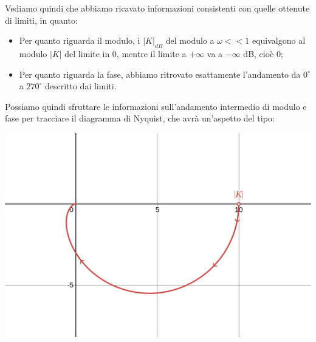 \documentclass[a4paper,11pt]{article}
\begin{document}
Vediamo quindi che abbiamo ricavato informazioni consistenti con quelle ottenute di limiti, in quanto:
\begin{itemize}
	\item Per quanto riguarda il modulo, i $|K|_{dB}$ del modulo a $\omega << 1$ equivalgono al modulo $|K|$ del limite in 0, mentre il limite a $+\infty$ va a $-\infty$ dB, cioè 0;
	\item Per quanto riguarda la fase, abbiamo ritrovato esattamente l'andamento da $0^\circ$ a $270^\circ$ descritto dai limiti.
\end{itemize}

Possiamo quindi sfruttare le informazioni sull'andamento intermedio di modulo e fase per tracciare il diagramma di Nyquist, che avrà un'aspetto del tipo:
\begin{center}
	\includegraphics[scale=0.28]{../figures/nyquist/second_ex_3.png}
\end{center}
\end{document}
